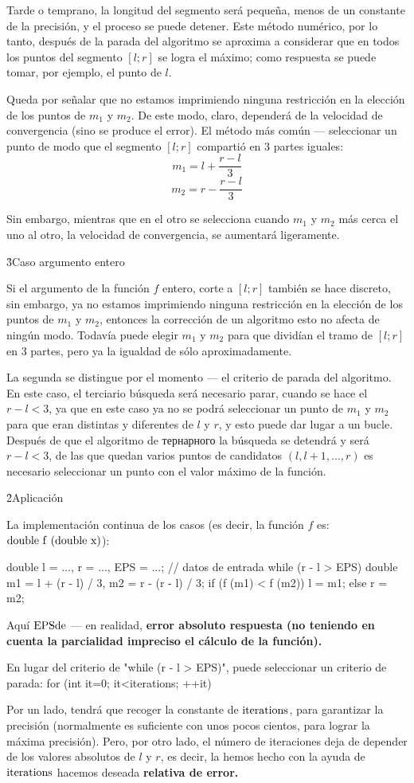 Tarde o temprano, la longitud del segmento será pequeña, menos de un constante de la precisión, y el proceso se puede detener. Este método numérico, por lo tanto, después de la parada del algoritmo se aproxima a considerar que en todos los puntos del segmento $[l;r]$ se logra el máximo; como respuesta se puede tomar, por ejemplo, el punto de $l$.

Queda por señalar que no estamos imprimiendo ninguna restricción en la elección de los puntos de $m_1$ y $m_2$. De este modo, claro, dependerá de la velocidad de convergencia (sino se produce el error). El método más común --- seleccionar un punto de modo que el segmento $[l;r]$ compartió en 3 partes iguales:
$$ m_1 = l + \frac{r-l}{3} $$
$$ m_2 = r - \frac{r-l}{3} $$

Sin embargo, mientras que en el otro se selecciona cuando $m_1$ y $m_2$ más cerca el uno al otro, la velocidad de convergencia, se aumentará ligeramente.

\h3{Caso argumento entero}

Si el argumento de la función $f$ entero, corte a $[l;r]$ también se hace discreto, sin embargo, ya no estamos imprimiendo ninguna restricción en la elección de los puntos de $m_1$ y $m_2$, entonces la corrección de un algoritmo esto no afecta de ningún modo. Todavía puede elegir $m_1$ y $m_2$ para que dividían el tramo de $[l;r]$ en 3 partes, pero ya la igualdad de sólo aproximadamente.

La segunda se distingue por el momento --- el criterio de parada del algoritmo. En este caso, el terciario búsqueda será necesario parar, cuando se hace el $r-l<3$, ya que en este caso ya no se podrá seleccionar un punto de $m_1$ y $m_2$ para que eran distintas y diferentes de $l$ y $r$, y esto puede dar lugar a un bucle. Después de que el algoritmo de тернарного la búsqueda se detendrá y será $r-l<3$, de las que quedan varios puntos de candidatos $(l,l+1,\ldots,r)$ es necesario seleccionar un punto con el valor máximo de la función.

\h2{Aplicación}

La implementación continua de los casos (es decir, la función $f$ es: $\rm double\ f\ (double\ x)$):

\code
double l = ..., r = ..., EPS = ...; // datos de entrada
while (r - l > EPS) {
double m1 = l + (r - l) / 3,
m2 = r - (r - l) / 3;
if (f (m1) < f (m2))
l = m1;
else
r = m2;
}
\endcode

Aquí $\rm EPS de$ --- en realidad, \bf{error absoluto} respuesta (no teniendo en cuenta la parcialidad impreciso el cálculo de la función).

En lugar del criterio de "while (r - l > EPS)", puede seleccionar un criterio de parada:
\code
for (int it=0; it<iterations; ++it)
\endcode

Por un lado, tendrá que recoger la constante de $\rm iterations$, para garantizar la precisión (normalmente es suficiente con unos pocos cientos, para lograr la máxima precisión). Pero, por otro lado, el número de iteraciones deja de depender de los valores absolutos de $l$ y $r$, es decir, la hemos hecho con la ayuda de $\rm iterations$ hacemos deseada \bf{relativa de error}.